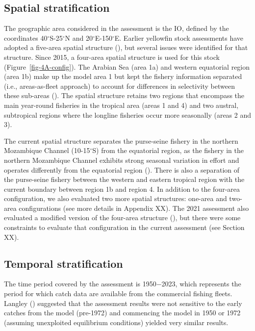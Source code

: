 \documentclass[
]{scrartcl}
\begin{document}
\subsection{Spatial stratification}\label{spatial-stratification}

The geographic area considered in the assessment is the IO, defined by
the coordinates 40\(^\circ\)S-25\(^\circ\)N and
20\(^\circ\)E-150\(^\circ\)E. Earlier yellowfin stock assessments have
adopted a five-area spatial structure
(), but several issues were identified for that
structure. Since 2015, a four-area spatial structure is used for this
stock (Figure~\ref{fig-4A-config}). The Arabian Sea (area 1a) and
western equatorial region (area 1b) make up the model area 1 but kept
the fishery information separated (i.e., areas-as-fleet approach) to
account for differences in selectivity between these sub-areas
(). The spatial
structure retains two regions that encompass the main year-round
fisheries in the tropical area (areas 1 and 4) and two austral,
subtropical regions where the longline fisheries occur more seasonally
(areas 2 and 3).

The current spatial structure separates the purse-seine fishery in the
northern Mozambique Channel (10-15\(^\circ\)S) from the equatorial
region, as the fishery in the northern Mozambique Channel exhibits
strong seasonal variation in effort and operates differently from the
equatorial region
().
There is also a separation of the purse-seine fishery between the
western and eastern tropical region with the current boundary between
region 1b and region 4. In addition to the four-area configuration, we
also evaluated two more spatial structures: one-area and two-area
configurations (see more details in Appendix XX). The 2021 assessment
also evaluated a modified version of the four-area structure
(), but
there were some constraints to evaluate that configuration in the
current assessment (see Section XX).

\subsection{Temporal stratification}\label{temporal-stratification}

The time period covered by the assessment is 1950−2023, which represents
the period for which catch data are available from the commercial
fishing fleets. Langley
() suggested
that the assessment results were not sensitive to the early catches from
the model (pre-1972) and commencing the model in 1950 or 1972 (assuming
unexploited equilibrium conditions) yielded very similar results.
\end{document}
